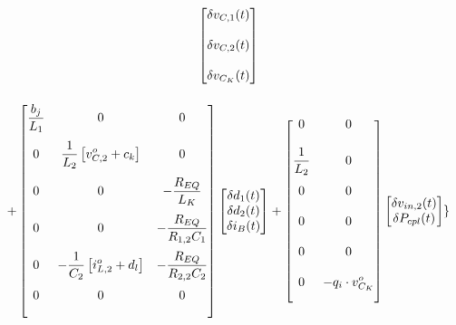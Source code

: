 \begin{gather}
\begin{bmatrix}
    \delta v_{C,1}(t) \\[12pt] \delta v_{C,2}(t) \\[12pt] \delta v_{C_K}(t)
  \end{bmatrix} \notag \\[12pt] +
    \begin{bmatrix}
    \displaystyle \frac{b_j}{L_1} & 0                 & 0                                                        \\[12pt]
    0                      & \displaystyle \frac{1}{L_2} \left[ v_{C,2}^o + c_k \right]     & 0                              
                                    \\[12pt]
    0                      & 0                 & - \displaystyle \frac{R_{EQ}}{L_K}                                     \\[12pt]
    0                      & 0                 & - \displaystyle \frac{R_{EQ}}{R_{1,2}C_1}                    \\[12pt]
    0                      & - \displaystyle \frac{1}{C_2} \left[ i_{L,2}^o + d_l \right]                 & - \displaystyle \frac{R_{EQ}}{R_{2,2}C_2}                                      \\[12pt]
    0                      & 0                 & 0 
                                    \\[12pt]
  \end{bmatrix}
  \begin{bmatrix}
    \delta d_1(t) \\ \delta d_2(t) \\ \delta i_{B}(t)
  \end{bmatrix} +
  \begin{bmatrix}
      0                   & 0
                            \\[12pt]
      \displaystyle \frac{1}{L_2}   & 0 
                            \\[12pt]
      0                   & 0
                            \\[12pt]
      0                   & 0
                            \\[12pt]
      0                   & 0
                            \\[12pt]
      0                   & - \displaystyle q_i \cdot v_{C_K}^o
                            \\[12pt]
  \end{bmatrix}
  \begin{bmatrix}
    \delta v_{in,2}(t) \\ \delta P_{cpl}(t)
  \end{bmatrix}
  \}
\end{gather}

